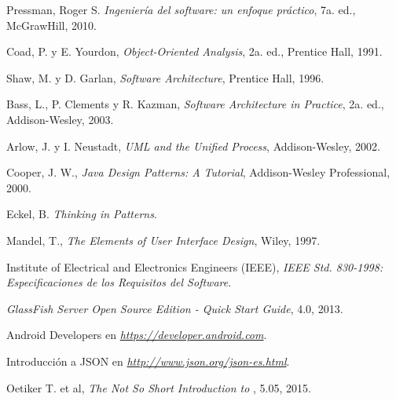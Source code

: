\begin{thebibliography}{} %
	
	Pressman, Roger S.
	\emph{Ingeniería del software: un enfoque práctico},
	7a. ed.,
	McGrawHill,
	2010.
	
	Coad, P. y E. Yourdon, 
	\emph{Object-Oriented Analysis}, 
	2a. ed., 
	Prentice Hall, 
	1991.
	
	Shaw, M. y D. Garlan, 
	\emph{Software Architecture}, 
	Prentice Hall, 
	1996.
	
	Bass, L., P. Clements y R. Kazman, 
	\emph{Software Architecture in Practice}, 
	2a. ed., 
	Addison-Wesley, 
	2003.
	
	Arlow, J. y I. Neustadt, 
	\emph{UML and the Unified Process}, 
	Addison-Wesley, 
	2002.
	
	Cooper, J. W.,
	\emph{Java Design Patterns: A Tutorial}, 
	Addison-Wesley Professional, 
	2000.
	
	Eckel, B.
	\emph{Thinking in Patterns}.
	
	Mandel, T.,
	\emph{The Elements of User Interface Design},
	Wiley, 
	1997.
	
	Institute of Electrical and Electronics Engineers (IEEE),
	\emph{IEEE Std. 830-1998: Especificaciones de los Requisitos del Software}.
	
	\emph{GlassFish Server Open Source Edition - Quick Start Guide},
	4.0,
	2013.
	
	Android Developers en
	\emph{\url{https://developer.android.com}}.
	
	Introducción a JSON en
	\emph{\url{http://www.json.org/json-es.html}}.
	
	Oetiker T. et al,
	\emph{The Not So Short Introduction to \LaTeXe},
	5.05,
	2015.
		
\end{thebibliography}